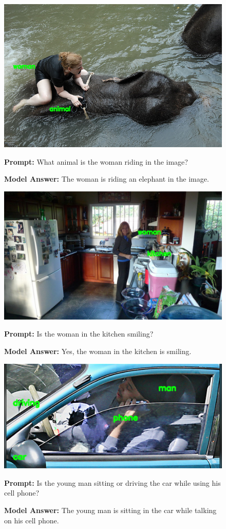 \documentclass[11pt]{article}
\begin{document}
\begin{figure}[H]
    \centering    
    \includegraphics[width=0.6\linewidth]{iclr2026/reordering_9.png}\par
    \vspace{1em}
    \raggedright
    \textbf{Prompt:} What animal is the woman riding in the image?
    
    \textbf{Model Answer:} The woman is riding an elephant in the image.
\end{figure}

\begin{figure}[H]
    \centering
    \includegraphics[width=0.7\linewidth]{iclr2026/reordering_10.png}\par
    \vspace{1em}
    \raggedright
    \textbf{Prompt:} Is the woman in the kitchen smiling?
    
    \textbf{Model Answer:} Yes, the woman in the kitchen is smiling.
\end{figure}





\begin{figure}[H]
    \centering
    \includegraphics[width=0.6\linewidth]{iclr2026/reordering_61.png}\par
    \vspace{1em}
    \raggedright
    \textbf{Prompt:} Is the young man sitting or driving the car while using his cell phone?
    
    \textbf{Model Answer:} The young man is sitting in the car while talking on his cell phone.
\end{figure}
\end{document}
